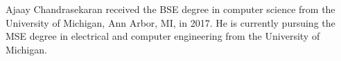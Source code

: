 \documentclass[journal]{IEEEtran}
\begin{document}
% 


\begin{IEEEbiographynophoto}{Ajaay Chandrasekaran}
  received the BSE degree in computer science from the University of Michigan, Ann Arbor, MI, in 2017.
  He is currently pursuing the MSE degree in electrical and computer engineering from the University of Michigan.%
\end{IEEEbiographynophoto}

\vfill









\end{document}
